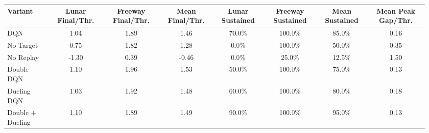 \begin{adjustbox}{width=\textwidth}
\begin{tabular}{@{}lccccccc@{}}
\toprule
\textbf{Variant} & \textbf{Lunar Final/Thr.} & \textbf{Freeway Final/Thr.} & \textbf{Mean Final/Thr.} & \textbf{Lunar Sustained} & \textbf{Freeway Sustained} & \textbf{Mean Sustained} & \textbf{Mean Peak Gap/Thr.} \\
\midrule
DQN & 1.04 & 1.89 & 1.46 & 70.0\% & 100.0\% & 85.0\% & 0.16 \\
No Target & 0.75 & 1.82 & 1.28 & 0.0\% & 100.0\% & 50.0\% & 0.35 \\
No Replay & -1.30 & 0.39 & -0.46 & 0.0\% & 25.0\% & 12.5\% & 1.50 \\
Double DQN & 1.10 & 1.96 & 1.53 & 50.0\% & 100.0\% & 75.0\% & 0.13 \\
Dueling DQN & 1.03 & 1.92 & 1.48 & 60.0\% & 100.0\% & 80.0\% & 0.18 \\
Double + Dueling & 1.10 & 1.89 & 1.49 & 90.0\% & 100.0\% & 95.0\% & 0.13 \\
\bottomrule
\end{tabular}
\end{adjustbox}
